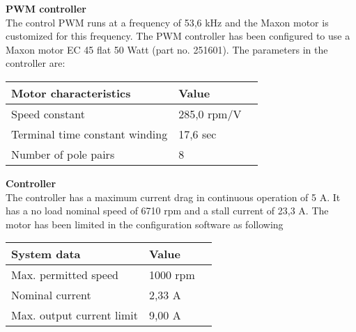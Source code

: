 \textbf{PWM controller}\\
The control PWM runs at a frequency of 53,6 kHz and the Maxon motor is customized for this frequency.
The PWM controller has been configured to use a Maxon motor EC 45 flat 50 Watt (part no. 251601). The parameters in the controller are:
\begin{table}[H]
	\begin{tabular}{|l|l|p{4.3cm}|}
		\hline%
		\textbf{Motor characteristics}       &  \textbf{Value}         \\
		\hline%
		Speed constant                                & 285,0 rpm/V           \\
		\hline%
		Terminal time constant winding							  & 17,6 sec              \\
		\hline%
		Number of pole pairs							  & 8              \\
		\hline%
	\end{tabular}
\end{table}

\textbf{Controller}\\
The controller has a maximum current drag in continuous operation of 5 A. It has a no load nominal speed of 6710 rpm and a stall current of 23,3 A. The motor has been limited in the configuration software as following
\begin{table}[H]
	\begin{tabular}{|l|l|p{4.3cm}|}
		\hline%
		\textbf{System data}       &  \textbf{Value}         \\
		\hline%
		Max. permitted speed                                & 1000 rpm           \\
		\hline%
		Nominal current							  & 2,33 A              \\
		\hline%
		Max. output current limit							  & 9,00 A              \\
		\hline%
	\end{tabular}
\end{table}

